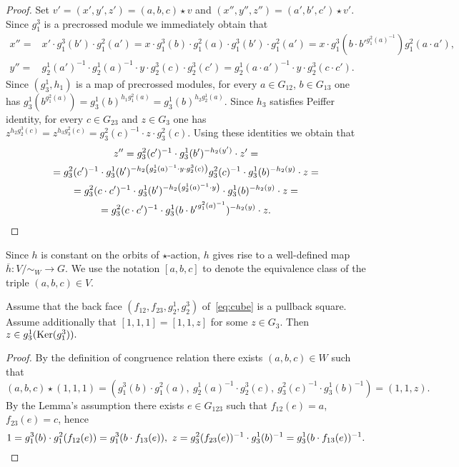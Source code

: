 \begin{proof}
    Set $v'=(x', y', z') = (a, b, c) \star v$ and $(x'', y'', z'') = (a', b', c') \star v'$.
    Since $g_1^3$ is a precrossed module we immediately obtain that
    \begin{align*}
        x'' =& x' \cdot g_1^3(b') \cdot g_1^2(a') = x \cdot g_1^3(b) \cdot g_1^2(a) \cdot g_1^3(b') \cdot g_1^2(a') = x \cdot g_1^3(b \cdot b'^{g_1^2(a)^{-1}}) g_1^2(a \cdot a'),\\
        y'' =& g_2^1(a')^{-1} \cdot g_2^1(a)^{-1} \cdot y \cdot g_2^3(c) \cdot g_2^3(c') = g_2^1(a\cdot a')^{-1} \cdot y \cdot g_2^{3}(c\cdot c'). \end{align*}
    Since $(g_3^1, h_1)$ is a map of precrossed modules, for every $a \in G_{12}$, $b \in G_{13}$ one has $g_3^1(b^{g_1^2(a)}) = g_3^1(b)^{h_1 g_1^2(a)} = g_3^1(b)^{h_2g_2^1(a)}$.
    Since $h_3$ satisfies Peiffer identity, for every $c \in G_{23}$ and $z \in G_3$ one has $z ^{h_2 g_2^3(c)} = z^{ h_3 g_3^2(c)} = g_3^2(c)^{-1} \cdot z \cdot g_3^2(c)$.
    Using these identities we obtain that
    \begin{multline*}
        z'' = g_3^2(c')^{-1} \cdot g_3^1(b')^{-h_2(y')} \cdot z' = \\
        = g_3^2(c')^{-1} \cdot g_3^1(b')^{- h_2 \left( g_2^1(a)^{-1} \cdot y \cdot g_2^3(c) \right)} g_3^2(c)^{-1} \cdot g_3^1(b)^{-h_2(y)} \cdot z = \\
        = g_3^2(c \cdot c')^{-1} \cdot g_3^1(b')^{- h_2 \left( g_2^1(a)^{-1} \cdot y \right)} \cdot g_3^1(b)^{-h_2(y)} \cdot z = \\
        = g_3^2(c \cdot c')^{-1} \cdot g_3^1(b \cdot {b'} ^ {g_1^2(a)^{-1}})^{- h_2 \left( y \right)} \cdot z. \qedhere
    \end{multline*}
\end{proof}
Since $h$ is constant on the orbits of $\star$-action, $h$ gives rise to a well-defined map $\overline{h} \colon V/\sim_W \to G$.
We use the notation $[a, b, c]$ to denote the equivalence class of the triple $(a, b, c) \in V$.

\begin{lemma}\label{lem:one-one-z} Assume that the back face $(f_{12}, f_{23}, g_2^1, g_2^3)$ of~\eqref{eq:cube} is a pullback square.
Assume additionally that $[1, 1, 1] = [1, 1, z]$ for some $z\in G_3$.
Then $z \in g_3^1(\operatorname{Ker}(g_1^3)).$ \end{lemma}
\begin{proof} By the definition of congruence relation there exists $(a, b, c)\in W$ such that
\[ (a, b, c) \star (1, 1, 1) = ( g_1^3(b) \cdot g_1^2(a),\ g_2^1(a)^{-1} \cdot g_2^3(c),\ g_3^2(c)^{-1} \cdot g_3^1(b)^{-1}) = (1,1,z). \]
By the Lemma's assumption there exists $e \in G_{123}$ such that $f_{12}(e) = a$, $f_{23}(e) = c$, hence
\[ 1 = g_1^3(b) \cdot g_1^2(f_{12}(e)) = g_1^3(b \cdot f_{13}(e)),\ z = g_3^2(f_{23}(e))^{-1} \cdot g_3^1(b)^{-1} = g_3^1(b \cdot f_{13}(e))^{-1}. \qedhere\] \end{proof}


